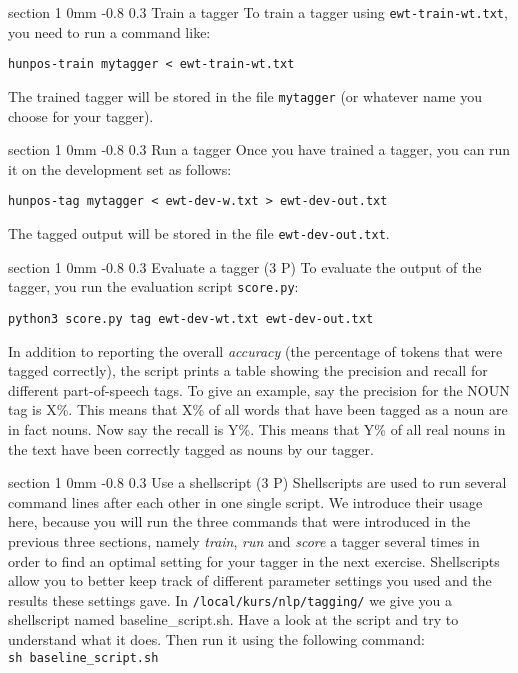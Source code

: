 \documentclass[11pt]{article}
\makeatletter
\newcommand{\newsec}[2]{\section{#1}\label{sec:#2}\noindent}
\renewcommand{\section}{\@startsection
{section}%
{1}%
{0mm}%
{-0.8\baselineskip}%
{0.3\baselineskip}%
{\bfseries\large}}%
\makeatother
\begin{document}
\newsec{Train a tagger}{train}%
To train a tagger using {\tt ewt-train-wt.txt}, you need to run a command like:
\begin{verbatim}
hunpos-train mytagger < ewt-train-wt.txt
\end{verbatim}
The trained tagger will be stored in the file {\tt mytagger} (or whatever name you choose for your tagger).

\newsec{Run a tagger}{run}%
Once you have trained a tagger, you can run it on the development set as follows:
\begin{verbatim}
hunpos-tag mytagger < ewt-dev-w.txt > ewt-dev-out.txt
\end{verbatim}
The tagged output will be stored in the file {\tt ewt-dev-out.txt}.

\newsec{Evaluate a tagger (3 P)}{eval}%
To evaluate the output of the tagger, you run the evaluation script {\tt score.py}:
\begin{verbatim}
python3 score.py tag ewt-dev-wt.txt ewt-dev-out.txt
\end{verbatim}
In addition to reporting the overall \emph{accuracy} (the percentage of tokens that were tagged correctly), the script prints a table showing the precision and recall for different part-of-speech tags. To give an example, say the precision for the NOUN tag is X\%. This means that X\% of all words that have been tagged as a noun are in fact nouns. Now say the recall is Y\%. This means that Y\% of all real nouns in the text have been correctly tagged as nouns by our tagger.

\newsec{Use a shellscript (3 P)}{shell}%
Shellscripts are used to run several command lines after each other in one single script. We introduce their usage here, because you will run the three commands that were introduced in the previous three sections, namely \emph{train}, \emph{run} and \emph{score} a tagger several times in order to find an optimal setting for your tagger in the next exercise. Shellscripts allow you to better keep track of different parameter settings you used and the results these settings gave. In \texttt{/local/kurs/nlp/tagging/} we give you a shellscript named baseline\_script.sh. Have a look at the script and try to understand what it does. Then run it using the following command:\\
\texttt{sh baseline\_script.sh}
%
%
%
%
%
%
\end{document}
